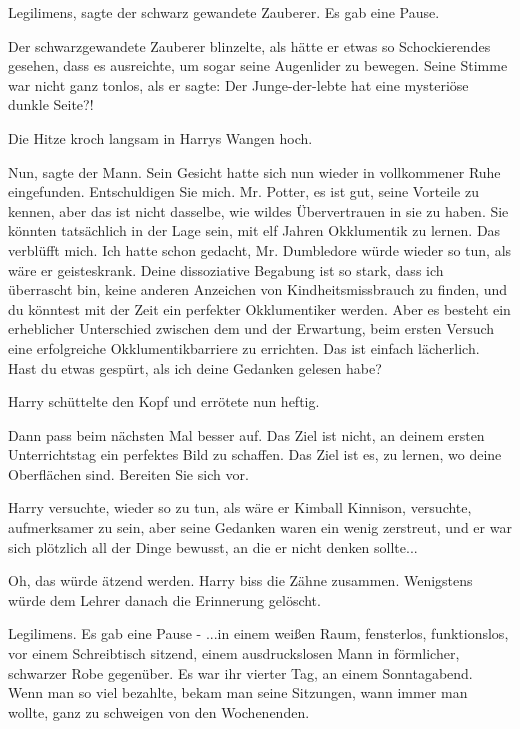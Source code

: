 \glqq{}Legilimens\grqq{}, sagte der schwarz gewandete Zauberer. Es gab eine
Pause.

Der schwarzgewandete Zauberer blinzelte, als hätte er etwas so Schockierendes
gesehen, dass es ausreichte, um sogar seine Augenlider zu bewegen. Seine Stimme
war nicht ganz tonlos, als er sagte: \glqq{}Der Junge-der-lebte hat eine
mysteriöse dunkle Seite?!\grqq{}

Die Hitze kroch langsam in Harrys Wangen hoch.

\glqq{}Nun\grqq{}, sagte der Mann. Sein Gesicht hatte sich nun wieder in
vollkommener Ruhe eingefunden. \glqq{}Entschuldigen Sie mich. Mr. Potter, es ist
gut, seine Vorteile zu kennen, aber das ist nicht dasselbe, wie wildes
Übervertrauen in sie zu haben. Sie könnten tatsächlich in der Lage sein, mit elf
Jahren Okklumentik zu lernen. Das verblüfft mich. Ich hatte schon gedacht, Mr.
Dumbledore würde wieder so tun, als wäre er geisteskrank. Deine dissoziative
Begabung ist so stark, dass ich überrascht bin, keine anderen Anzeichen von
Kindheitsmissbrauch zu finden, und du könntest mit der Zeit ein perfekter
Okklumentiker werden. Aber es besteht ein erheblicher Unterschied zwischen dem
und der Erwartung, beim ersten Versuch eine erfolgreiche Okklumentikbarriere zu
errichten. Das ist einfach lächerlich. Hast du etwas gespürt, als ich deine
Gedanken gelesen habe?\grqq{}

Harry schüttelte den Kopf und errötete nun heftig.

\glqq{}Dann pass beim nächsten Mal besser auf. Das Ziel ist nicht, an deinem
ersten Unterrichtstag ein perfektes Bild zu schaffen. Das Ziel ist es, zu
lernen, wo deine Oberflächen sind. Bereiten Sie sich vor.\grqq{}

Harry versuchte, wieder so zu tun, als wäre er Kimball Kinnison, versuchte,
aufmerksamer zu sein, aber seine Gedanken waren ein wenig zerstreut, und er war
sich plötzlich all der Dinge bewusst, an die er nicht denken sollte...

Oh, das würde ätzend werden. Harry biss die Zähne zusammen. Wenigstens würde dem
Lehrer danach die Erinnerung gelöscht.

\glqq{}Legilimens.\grqq{} Es gab eine Pause - ...in einem weißen Raum,
fensterlos, funktionslos, vor einem Schreibtisch sitzend, einem ausdruckslosen
Mann in förmlicher, schwarzer Robe gegenüber. Es war ihr vierter Tag, an einem
Sonntagabend. Wenn man so viel bezahlte, bekam man seine Sitzungen, wann immer
man wollte, ganz zu schweigen von den Wochenenden.

